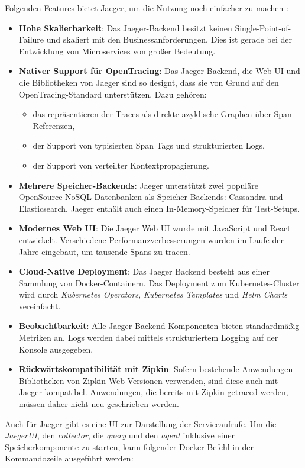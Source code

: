 Folgenden Features bietet Jaeger, um die Nutzung noch einfacher zu machen \cite{jaeger}:
\begin{itemize}
	\item \textbf{Hohe Skalierbarkeit}: Das Jaeger-Backend besitzt keinen Single-Point-of-Failure und skaliert mit den Businessanforderungen. Dies ist gerade bei der Entwicklung von Microservices von großer Bedeutung.
	\item \textbf{Nativer Support für OpenTracing}: Das Jaeger Backend, die Web UI und die Bibliotheken von Jaeger sind so designt, dass sie von Grund auf den OpenTracing-Standard unterstützen. Dazu gehören:
	\begin{itemize}
		\item das repräsentieren der Traces als direkte azyklische Graphen über Span-Referenzen,
		\item der Support von typisierten Span Tags und strukturierten Logs,
		\item der Support von verteilter Kontextpropagierung.
	\end{itemize}
	\item \textbf{Mehrere Speicher-Backends}: Jaeger unterstützt zwei populäre OpenSource NoSQL-Datenbanken als Speicher-Backends: Cassandra und Elasticsearch. Jaeger enthält auch einen In-Memory-Speicher für Test-Setups.
	\item \textbf{Modernes Web UI}: Die Jaeger Web UI wurde mit JavaScript und React entwickelt. Verschiedene Performanzverbesserungen wurden im Laufe der Jahre eingebaut, um tausende Spans zu tracen.
	\item \textbf{Cloud-Native Deployment}: Das Jaeger Backend besteht aus einer Sammlung von Docker-Containern. Das Deployment zum Kubernetes-Cluster wird durch \textit{Kubernetes Operators}, \textit{Kubernetes Templates} und \textit{Helm Charts} vereinfacht.
	\item \textbf{Beobachtbarkeit}: Alle Jaeger-Backend-Komponenten bieten standardmäßig Metriken an. Logs werden dabei mittels strukturiertem Logging auf der Konsole ausgegeben.
	\item \textbf{Rückwärtskompatibilität mit Zipkin}: Sofern bestehende Anwendungen Bibliotheken von Zipkin Web-Versionen verwenden, sind diese auch mit Jaeger kompatibel. Anwendungen, die bereits mit Zipkin getraced werden, müssen daher nicht neu geschrieben werden.
\end{itemize}

Auch für Jaeger gibt es eine UI zur Darstellung der Serviceaufrufe. Um die \textit{JaegerUI}, den \textit{collector}, die \textit{query} und den \textit{agent} inklusive einer Speicherkomponente zu starten, kann folgender Docker-Befehl in der Kommandozeile ausgeführt werden:

